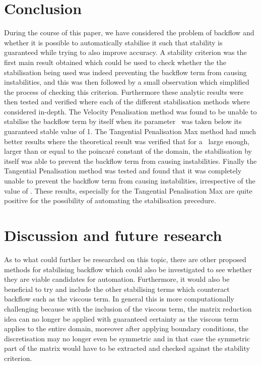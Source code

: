 
\section{Conclusion}
During the course of this paper, we have considered the problem of backflow and whether it is possible to automatically stabilise it such that stability is guaranteed while trying to also improve accuracy. A stability criterion was the first main result obtained which could be used to check whether the the stabilisation being used was indeed preventing the backflow term from causing instabilities, and this was then followed by a small observation which simplified the process of checking this criterion. Furthermore these analytic results were then tested and verified where each of the different stabilisation methods where considered in-depth. The Velocity Penalisation method was found to be unable to stabilise the backflow term by itself when its parameter \mbeta~was taken below its guaranteed stable value of 1. The Tangential Penalisation Max method had much better results where the theoretical result was verified that for a \mgamma~large enough, larger than or equal to the poincar\'e constant of the domain, the stabilisation by itself was able to prevent the backflow term from causing instabilities. Finally the Tangential Penalisation method was tested and found that it was completely unable to prevent the backflow term from causing instabilities, irrespective of the value of \mgamma. These results, especially for the Tangential Penalisation Max are quite positive for the possibility of automating the stabilisation precedure.

\section{Discussion and future research}
As to what could further be researched on this topic, there are other proposed methods for stabilising backflow which could also be investigated to see whether they are viable candidates for automation. Furthermore, it would also be beneficial to try and include the other stabilising terms which counteract backflow such as the viscous term. In general this is more computationally challenging because with the inclusion of the viscous term, the matrix reduction idea can no longer be applied with guaranteed certainty as the viscous term applies to the entire domain, moreover after applying boundary conditions, the discretisation may no longer even be symmetric and in that case the symmetric part of the matrix would have to be extracted and checked against the stability criterion.